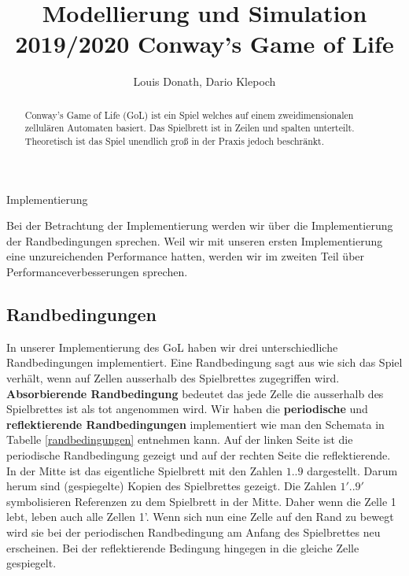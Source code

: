 \documentclass[runningheads]{llncs}
\begin{document}
%
\title{Modellierung und Simulation 2019/2020 Conway's Game of Life}
\author{Louis Donath, Dario Klepoch}
%
\authorrunning{}


\maketitle              

\begin{abstract}
Conway's Game of Life (GoL) ist ein Spiel welches auf einem zweidimensionalen zellulären Automaten basiert.
Das Spielbrett ist in Zeilen und spalten unterteilt.
Theoretisch ist das Spiel unendlich groß in der Praxis jedoch beschränkt.
\end{abstract}
%


\begin{section}{Implementierung}
    
    Bei der Betrachtung der Implementierung werden wir über die Implementierung der Randbedingungen sprechen.
    Weil wir mit unseren ersten Implementierung eine unzureichenden Performance hatten,
    werden wir im zweiten Teil über Performanceverbesserungen sprechen.

    \subsection{Randbedingungen}
        In unserer Implementierung des GoL haben wir drei unterschiedliche Randbedingungen implementiert.
        Eine Randbedingung sagt aus wie sich das Spiel verhält, wenn auf Zellen ausserhalb des Spielbrettes zugegriffen wird. \newline
        \textbf{Absorbierende Randbedingung} bedeutet das jede Zelle die ausserhalb des Spielbrettes ist als tot angenommen wird.\newline
        Wir haben die \textbf{periodische} und \textbf{reflektierende Randbedingungen} implementiert wie man den Schemata in Tabelle \ref{randbedingungen} entnehmen kann.
        Auf der linken Seite ist die periodische Randbedingung gezeigt und auf der rechten Seite die reflektierende.
        In der Mitte ist das eigentliche Spielbrett mit den Zahlen $1..9$ dargestellt.
        Darum herum sind (gespiegelte) Kopien des Spielbrettes gezeigt.
        Die Zahlen $1'..9'$ symbolisieren Referenzen zu dem Spielbrett in der Mitte.
        Daher wenn die Zelle 1 lebt, leben auch alle Zellen 1'.
        Wenn sich nun eine Zelle auf den Rand zu bewegt wird sie bei der periodischen Randbedingung am Anfang des Spielbrettes neu erscheinen.
        Bei der reflektierende Bedingung hingegen in die gleiche Zelle gespiegelt.



\end{section}
\end{document}

